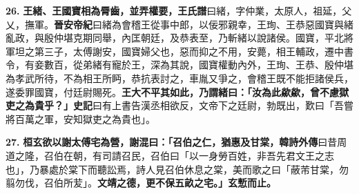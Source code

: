 \textbf{26.} \textbf{王緒、王國寶相為脣齒，並弄權要，}{\footnotesize \textbf{王氏譜}曰緒，字仲業，太原人，祖延，父乂，撫軍。\textbf{晉安帝紀}曰緒為會稽王從事中郎，以佞邪親幸，王珣、王恭惡國寶與緒亂政，與殷仲堪克期同舉，內匡朝廷，及恭表至，乃斬緒以說諸侯。國寶，平北將軍坦之第三子，太傅謝安，國寶婦父也，惡而抑之不用，安薨，相王輔政，遷中書令，有妾數百，從弟緒有寵於王，深為其說，國寶權動內外，王珣、王恭、殷仲堪為孝武所待，不為相王所眄，恭抗表討之，車胤又爭之，會稽王既不能拒諸侯兵，遂委罪國寶，付廷尉賜死。}\textbf{王大不平其如此，乃謂緒曰：「汝為此歘歘，曾不慮獄吏之為貴乎？」}{\footnotesize \textbf{史記}曰有上書告漢丞相欲反，文帝下之廷尉，勃既出，歎曰「吾嘗將百萬之軍，安知獄吏之為貴也」。}

\textbf{27.} \textbf{桓玄欲以謝太傅宅為營，謝混曰：「召伯之仁，猶惠及甘棠，}{\footnotesize \textbf{韓詩外傳}曰昔周道之隆，召伯在朝，有司請召民，召伯曰「以一身勞百姓，非吾先君文王之志也」，乃暴處於棠下而聽訟焉，詩人見召伯休息之棠，美而歌之曰「蔽芾甘棠，勿翦勿伐，召伯所苃」。}\textbf{文靖之德，更不保五畝之宅。」玄慙而止。}